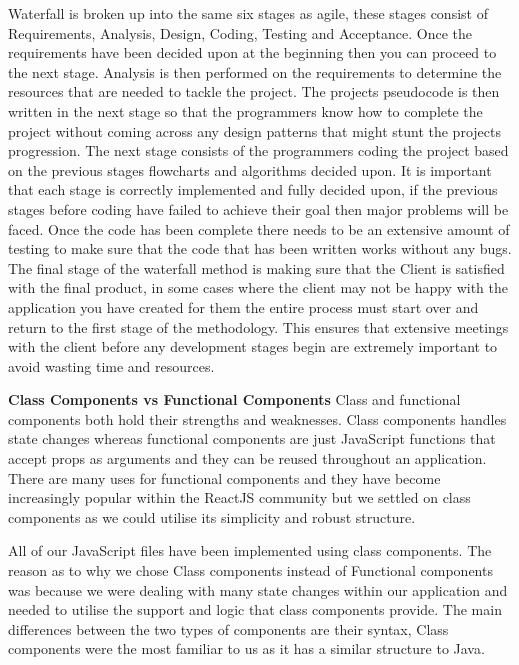 Waterfall is broken up into the same six stages as agile, these stages consist of Requirements, Analysis, Design, Coding, Testing and Acceptance. Once the requirements have been decided upon at the beginning then you can proceed to the next stage. Analysis is then performed on the requirements to determine the resources that are needed to tackle the project. The projects pseudocode is then written in the next stage so that the programmers know how to complete the project without coming across any design patterns that might stunt the projects progression. The next stage consists of the programmers coding the project based on the previous stages flowcharts and algorithms decided upon. It is important that each stage is correctly implemented and fully decided upon, if the previous stages before coding have failed to achieve their goal then major problems will be faced. Once the code has been complete there needs to be an extensive amount of testing to make sure that the code that has been written works without any bugs. The final stage of the waterfall method is making sure that the Client is satisfied with the final product, in some cases where the client may not be happy with the application you have created for them the entire process must start over and return to the first stage of the methodology. This ensures that extensive meetings with the client before any development stages begin are extremely important to avoid wasting time and resources. \cite{waterfall}

\item \textbf{Class Components vs Functional Components}
Class and functional components both hold their strengths and weaknesses. Class components handles state changes whereas functional components are just JavaScript functions that accept props as arguments and they can be reused throughout an application. There are many uses for functional components and they have become increasingly popular within the ReactJS community but we settled on class components as we could utilise its simplicity and robust structure.

All of our JavaScript files have been implemented using class components. The reason as to why we chose Class components instead of Functional components was because we were dealing with many state changes within our application and needed to utilise the support and logic that class components provide. The main differences between the two types of components are their syntax, Class components were the most familiar to us as it has a similar structure to Java.


